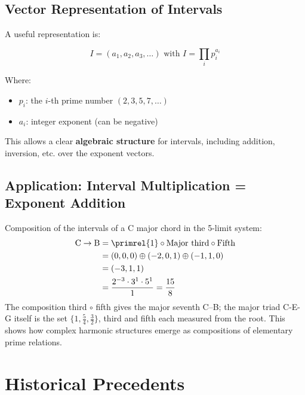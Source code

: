 	\subsection{Vector Representation of Intervals}
	
	A useful representation is:
	
	\begin{definition}
		\begin{equation}
			I = (a_1, a_2, a_3, \ldots) \text{ with } I = \prod_{i} p_i^{a_i}
		\end{equation}
		
		Where:
		\begin{itemize}
			\item $p_i$: the $i$-th prime number $(2, 3, 5, 7, \ldots)$
			\item $a_i$: integer exponent (can be negative)
		\end{itemize}
	\end{definition}
	
	This allows a clear \textbf{algebraic structure} for intervals, including addition, inversion, etc. over the exponent vectors.
	
	\subsection{Application: Interval Multiplication = Exponent Addition}
	
	\begin{example}
		Composition of the intervals of a C major chord in the 5-limit system:
		\begin{align}
			\text{C}\to\text{B} &= \primrel{1} \circ \text{Major third} \circ \text{Fifth} \\
			&= (0,0,0) \oplus (-2,0,1) \oplus (-1,1,0) \\
			&= (-3,1,1) \\
			&= \frac{2^{-3} \cdot 3^1 \cdot 5^1}{1} = \frac{15}{8}
		\end{align}
		The composition third $\circ$ fifth gives the major seventh C--B; the major triad C-E-G itself is the set $\{1, \tfrac54, \tfrac32\}$, third and fifth each measured from the root.
		This shows how complex harmonic structures emerge as compositions of elementary prime relations.
	\end{example}
	
	\section{Historical Precedents}
	
